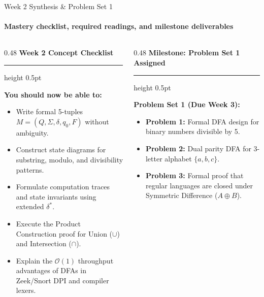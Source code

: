 \documentclass[aspectratio=169, 10pt]{beamer}
\newcommand{\colheader}[1]{%
  {\noindent\footnotesize\bfseries\color{gimpanavy}#1}%
  \vspace{0.02cm}%
  {\color{gimpanavy!30}\hrule height 0.5pt}%
  \vspace{0.05cm}%
}
\newcommand{\cardtitle}[1]{{\noindent\footnotesize\bfseries\color{gimpanavy}#1}\par\vspace{0.03cm}}
\newcommand{\greentitle}[1]{{\noindent\footnotesize\bfseries\color{accentGreen}#1}\par\vspace{0.03cm}}
\begin{document}
\begin{frame}{Week 2 Synthesis \& Problem Set 1}
  \framesubtitle{Mastery checklist, required readings, and milestone deliverables}
  
  \begin{columns}[T]
    \begin{column}{0.48\textwidth}
      \colheader{Week 2 Concept Checklist}
      \begin{tcolorbox}[conceptcard]
        \cardtitle{You should now be able to:}
        \begin{itemize}\setlength{\itemsep}{2pt}\scriptsize
          \item Write formal 5-tuples $M = (Q, \Sigma, \delta, q_0, F)$ without ambiguity.
          \item Construct state diagrams for substring, modulo, and divisibility patterns.
          \item Formulate computation traces and state invariants using extended $\delta^*$.
          \item Execute the Product Construction proof for Union ($\cup$) and Intersection ($\cap$).
          \item Explain the $\mathcal{O}(1)$ throughput advantages of DFAs in Zeek/Snort DPI and compiler lexers.
        \end{itemize}
      \end{tcolorbox}
    \end{column}
    
    \begin{column}{0.48\textwidth}
      \colheader{Milestone: Problem Set 1 Assigned}
      \begin{tcolorbox}[examplecard]
        \greentitle{Problem Set 1 (Due Week 3):}
        \begin{itemize}\setlength{\itemsep}{1.5pt}\scriptsize
          \item \textbf{Problem 1:} Formal DFA design for binary numbers divisible by 5.
          \item \textbf{Problem 2:} Dual parity DFA for 3-letter alphabet $\{a, b, c\}$.
          \item \textbf{Problem 3:} Formal proof that regular languages are closed under Symmetric Difference ($A \oplus B$).
        \end{itemize}
        \vspace{0.04cm}
        

\end{tcolorbox}
\end{column}
\end{columns}
\end{frame}
\end{document}
